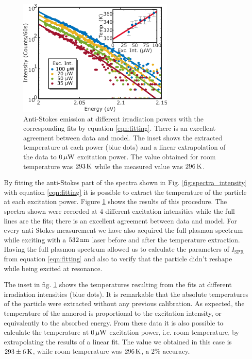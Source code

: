 \begin{figure}[tp] \centering
\includegraphics[width=78.4mm]{Chapters/04_Anti-Stokes/Figures/03_Fit_Of_AS/03_Log_Fit_AS.png}
\caption{Anti-Stokes emission at different irradiation powers with the
corresponding fits by equation \ref{eqn:fitting}. There is an excellent
agreement between data and model. The inset shows the extracted
temperature at each power (blue dots) and a linear extrapolation of the data to $0\,\mu\textrm{W}$ excitation power.
The value obtained for room temperature was $293\,\textrm{K}$ while the measured value was
$296\,\textrm{K}$.}
	\label{fig:AS_in_Log}
\end{figure}

By fitting the anti-Stokes part of the spectra shown in Fig.
\ref{fig:spectra_intensity} with equation \ref{eqn:fitting} it is possible to extract
the temperature of the particle at each excitation power. Figure
\ref{fig:AS_in_Log} shows the results of this procedure. The spectra shown were
recorded at $4$ different excitation intensities while the full lines are the
fits; there is an excellent agreement between data and model. For every
anti-Stokes measurement we have also acquired the full plasmon spectrum while
exciting with a $532\,\textrm{nm}$ laser before and after the temperature extraction.
Having the full plasmon spectrum allowed us to calculate the parameters of
$I_\textrm{SPR}$ from equation \ref{eqn:fitting} and also to verify that the
particle didn't reshape while being excited at resonance. 

The inset in fig. \ref{fig:AS_in_Log} shows the temperatures resulting from the
fits at different irradiation intensities (blue dots). It is remarkable that the
absolute temperatures of the particle were extracted without any previous
calibration. As expected, the temperature of the nanorod is proportional to the
excitation intensity, or equivalently to the absorbed energy. From these data it
is also possible to calculate the temperature at $0\,\mu\textrm{W}$ excitation power, i.e.
room temperature, by extrapolating the results of a linear fit. The value we
obtained in this case is $293\pm 6 \,\textrm{K}$, while room temperature was $296\,\textrm{K}$, a
$2\%$ accuracy.


